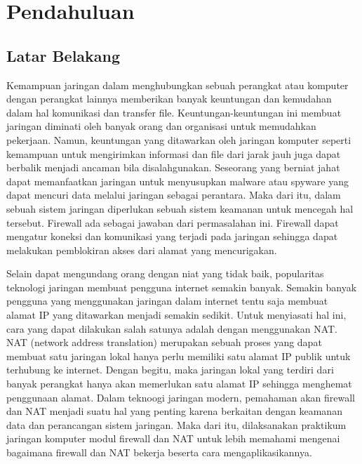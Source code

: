\section{Pendahuluan}
\subsection{Latar Belakang}
Kemampuan jaringan dalam menghubungkan sebuah perangkat atau komputer dengan perangkat lainnya memberikan banyak keuntungan dan kemudahan dalam hal komunikasi dan transfer file. Keuntungan-keuntungan ini membuat jaringan diminati oleh banyak orang dan organisasi untuk memudahkan pekerjaan. Namun, keuntungan yang ditawarkan oleh jaringan komputer seperti kemampuan untuk mengirimkan informasi dan file dari jarak jauh juga dapat berbalik menjadi ancaman bila disalahgunakan. Seseorang yang berniat jahat dapat memanfaatkan jaringan untuk menyusupkan malware atau spyware yang dapat mencuri data melalui jaringan sebagai perantara. Maka dari itu, dalam sebuah sistem jaringan diperlukan sebuah sistem keamanan untuk mencegah hal tersebut. Firewall ada sebagai jawaban dari permasalahan ini. Firewall dapat mengatur koneksi dan komunikasi yang terjadi pada jaringan sehingga dapat melakukan pemblokiran akses dari alamat yang mencurigakan.

Selain dapat mengundang orang dengan niat yang tidak baik, popularitas teknologi jaringan membuat pengguna internet semakin banyak. Semakin banyak pengguna yang menggunakan jaringan dalam internet tentu saja membuat alamat IP yang ditawarkan menjadi semakin sedikit. Untuk menyiasati hal ini, cara yang dapat dilakukan salah satunya adalah dengan menggunakan NAT. NAT (network address translation) merupakan sebuah proses yang dapat membuat satu jaringan lokal hanya perlu memiliki satu alamat IP publik untuk terhubung ke internet. Dengan begitu, maka jaringan lokal yang terdiri dari banyak perangkat hanya akan memerlukan satu alamat IP sehingga menghemat penggunaan alamat. Dalam teknoogi jaringan modern, pemahaman akan firewall dan NAT menjadi suatu hal yang penting karena berkaitan dengan keamanan data dan perancangan sistem jaringan. Maka dari itu, dilaksanakan praktikum jaringan komputer modul firewall dan NAT untuk lebih memahami mengenai bagaimana firewall dan NAT bekerja beserta cara mengaplikasikannya.
